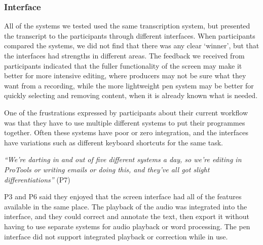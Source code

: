 


\subsubsection{Interface}

All of the systems we tested used the same transcription system, but presented the transcript to the participants
through different interfaces. When participants compared the systems, we did not find that there was any clear
`winner', but that the interfaces had strengths in different areas. The feedback we received from participants
indicated that the fuller functionality of the screen may make it better for more intensive editing, where producers
may not be sure what they want from a recording, while the more lightweight pen system may be better for quickly
selecting and removing content, when it is already known what is needed.

One of the frustrations expressed by participants about their current workflow was that they have to use multiple
different systems to put their programmes together. Often these systems have poor or zero integration, and the
interfaces have variations such as different keyboard shortcuts for the same task.

\textit{``We're darting in and out of five different systems a day, so we're editing in ProTools or writing emails or
doing this, and they've all got slight differentiations''} (P7)

P3 and P6 said they enjoyed that the screen interface had all of the features available in the same place. The playback
of the audio was integrated into the interface, and they could correct and annotate the text, then export it without
having to use separate systems for audio playback or word processing. The pen interface did not support integrated
playback or correction while in use.


